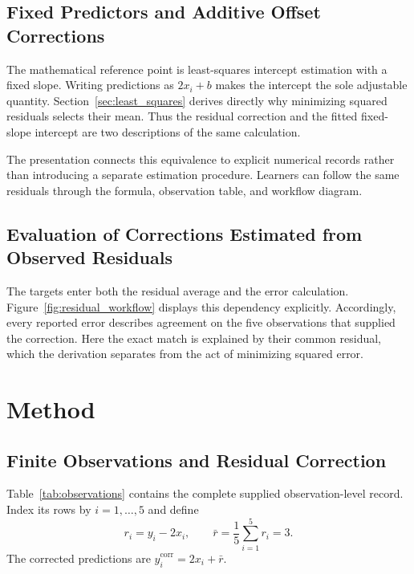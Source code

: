 \documentclass[11pt]{article}
\begin{document}
\subsection{Fixed Predictors and Additive Offset Corrections}

The mathematical reference point is least-squares intercept estimation with a fixed slope. Writing predictions as $2x_i+b$ makes the intercept the sole adjustable quantity. Section~\ref{sec:least_squares} derives directly why minimizing squared residuals selects their mean. Thus the residual correction and the fitted fixed-slope intercept are two descriptions of the same calculation.

The presentation connects this equivalence to explicit numerical records rather than introducing a separate estimation procedure. Learners can follow the same residuals through the formula, observation table, and workflow diagram.

\subsection{Evaluation of Corrections Estimated from Observed Residuals}

The targets enter both the residual average and the error calculation. Figure~\ref{fig:residual_workflow} displays this dependency explicitly. Accordingly, every reported error describes agreement on the five observations that supplied the correction. Here the exact match is explained by their common residual, which the derivation separates from the act of minimizing squared error.

\section{Method}

\subsection{Finite Observations and Residual Correction}

Table~\ref{tab:observations} contains the complete supplied observation-level record. Index its rows by $i=1,\ldots,5$ and define
\[
r_i=y_i-2x_i,
\qquad
\bar r=\frac{1}{5}\sum_{i=1}^{5}r_i=3.
\]
The corrected predictions are $\hat y_i^{\mathrm{corr}}=2x_i+\bar r$.
\end{document}

